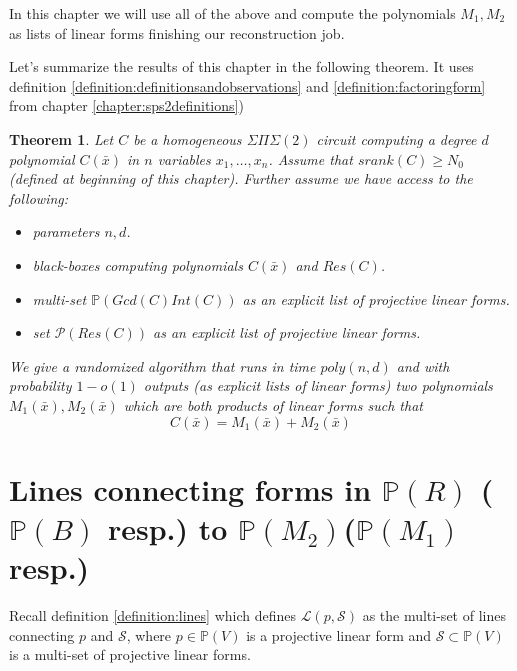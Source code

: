 \documentclass[12pt]{caltech_thesis}
\theoremstyle{plain}
\newtheorem{theorem}{Theorem}
\theoremstyle{definition}
\newcommand{\MS}{\mathcal{S}}
\newcommand{\ML}{\mathcal{L}}
\newcommand{\MP}{\mathcal{P}}
\newcommand{\PP}{\mathbb{P}}
\newcommand{\B}[1]{\bar{#1}}
\begin{document}
In this chapter we will use all of the above and compute the polynomials $M_1,M_2$ as lists of linear forms finishing our reconstruction job.


Let's summarize the results of this chapter in the following theorem. It uses definition \ref{definition:definitionsandobservations} and \ref{definition:factoringform} 
from chapter \ref{chapter:sps2definitions})

\begin{theorem}\label{theorem:steptwo}
Let $C$ be a homogeneous $\Sigma\Pi\Sigma(2)$ circuit computing a degree $d$ polynomial $C(\B{x})$ in $n$ variables $x_1,\ldots,x_n$. 
Assume that $srank(C)\geq N_0$ (defined at beginning of this chapter). Further assume we have access to the following:
\begin{itemize}
\renewcommand\labelitemi{--}

\item parameters $n,d$.
 \item black-boxes computing polynomials $C(\B{x})$ and $Res(C)$.
 \item multi-set $\PP(Gcd(C)Int(C))$ as an explicit list of projective linear forms.
 \item set $\MP(Res(C))$ as an explicit list of projective linear forms.
\end{itemize}
We give a randomized algorithm that runs in time $poly(n,d)$ and with probability $1-o(1)$ outputs (as explicit lists of linear forms) two polynomials
$M_1(\B{x}), M_2(\B{x})$ which are both products of linear forms such that
\[
 C(\B{x}) = M_1(\B{x}) + M_2(\B{x})
\]

\end{theorem}

\section{Lines connecting forms in $\PP(R)$ ($\PP(B)$ resp.) to $\PP(M_2)$($\PP(M_1)$ resp.) }
 
 Recall definition \ref{definition:lines} which defines $\ML(p,\MS)$ as the multi-set of lines connecting $p$ and $\MS$,
where $p \in \PP(V)$ is a   projective linear form and  $\MS\subset \PP(V)$ is a multi-set of projective linear forms.
\end{document}
